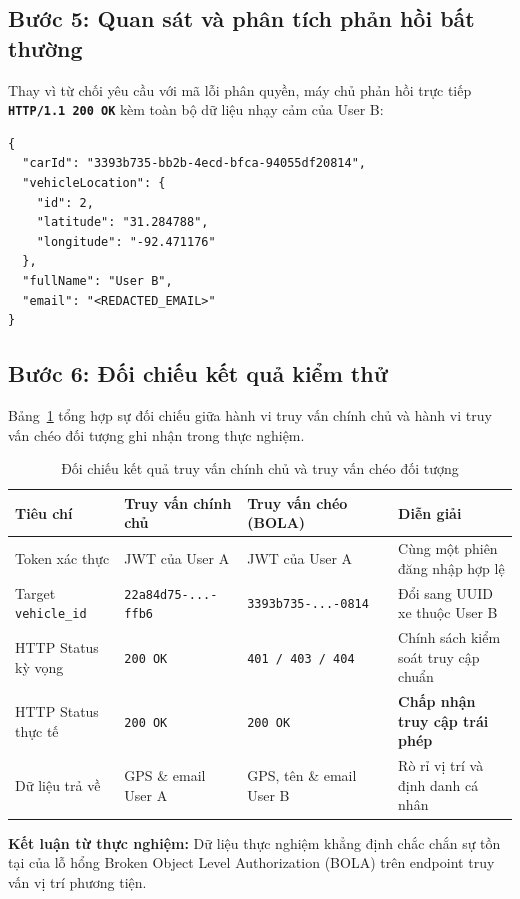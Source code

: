 \documentclass[11pt, a4paper]{article}
\begin{document}
\subsection{Bước 5: Quan sát và phân tích phản hồi bất thường}

Thay vì từ chối yêu cầu với mã lỗi phân quyền, máy chủ phản hồi trực tiếp \textbf{\texttt{HTTP/1.1 200 OK}} kèm toàn bộ dữ liệu nhạy cảm của User B:

\begin{verbatim}
{
  "carId": "3393b735-bb2b-4ecd-bfca-94055df20814",
  "vehicleLocation": {
    "id": 2,
    "latitude": "31.284788",
    "longitude": "-92.471176"
  },
  "fullName": "User B",
  "email": "<REDACTED_EMAIL>"
}
\end{verbatim}

\subsection{Bước 6: Đối chiếu kết quả kiểm thử}

Bảng~\ref{tab:comparison} tổng hợp sự đối chiếu giữa hành vi truy vấn chính chủ và hành vi truy vấn chéo đối tượng ghi nhận trong thực nghiệm.

\begin{table}[htbp]
\centering
\caption{Đối chiếu kết quả truy vấn chính chủ và truy vấn chéo đối tượng}
\label{tab:comparison}
\begin{tabularx}{\textwidth}{@{} l l l X @{}}
\toprule
\textbf{Tiêu chí} & \textbf{Truy vấn chính chủ} & \textbf{Truy vấn chéo (BOLA)} & \textbf{Diễn giải} \\
\midrule
Token xác thực & JWT của User A & JWT của User A & Cùng một phiên đăng nhập hợp lệ \\
Target \texttt{vehicle\_id} & \texttt{22a84d75-...-ffb6} & \texttt{3393b735-...-0814} & Đổi sang UUID xe thuộc User B \\
HTTP Status kỳ vọng & \texttt{200 OK} & \texttt{401 / 403 / 404} & Chính sách kiểm soát truy cập chuẩn \\
HTTP Status thực tế & \texttt{200 OK} & \texttt{200 OK} & \textbf{Chấp nhận truy cập trái phép} \\
Dữ liệu trả về & GPS \& email User A & GPS, tên \& email User B & Rò rỉ vị trí và định danh cá nhân \\
\bottomrule
\end{tabularx}
\end{table}

\noindent\textbf{Kết luận từ thực nghiệm:} Dữ liệu thực nghiệm khẳng định chắc chắn sự tồn tại của lỗ hổng Broken Object Level Authorization (BOLA) trên endpoint truy vấn vị trí phương tiện.
\end{document}
